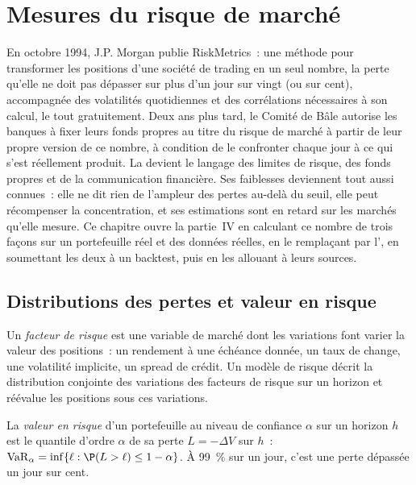 \chapter{Mesures du risque de marché}\label{ch:rc:market-risk-measures}

En octobre 1994, J.P. Morgan publie RiskMetrics~: une méthode pour transformer les positions d'une société de trading
en un seul nombre, la perte qu'elle ne doit pas dépasser sur plus d'un jour sur vingt (ou
sur cent), accompagnée des volatilités quotidiennes et des corrélations nécessaires à son calcul,
le tout gratuitement. Deux ans plus tard, le Comité de Bâle autorise les banques à fixer leurs fonds propres
au titre du risque de marché à partir de leur propre version de ce nombre, à condition
de le confronter chaque jour à ce qui s'est réellement produit. La  devient le langage
des limites de risque, des fonds propres et de la communication financière. Ses faiblesses deviennent tout aussi connues~: elle ne dit rien de l'ampleur des pertes au-delà du seuil,
elle peut récompenser la concentration, et ses estimations sont en retard sur les marchés qu'elle mesure. Ce chapitre
ouvre la partie~IV en calculant ce nombre de trois façons sur un portefeuille réel et des données réelles,
en le remplaçant par l', en soumettant les deux à un backtest, puis en les allouant à leurs sources.

\section{Distributions des pertes et valeur en risque}

\begin{definition}\label{def:rc:market-risk-measures:factor}
Un \emph{facteur de risque} est une variable de marché dont les variations font
varier la valeur des positions~: un rendement à une échéance donnée, un taux de change, une volatilité implicite, un spread de crédit.
Un modèle de risque décrit la distribution conjointe des variations des facteurs de risque sur un horizon
et réévalue les positions sous ces variations.
\end{definition}

\begin{definition}\label{def:rc:market-risk-measures:var}
La \emph{valeur en risque} d'un portefeuille au niveau de confiance $\alpha$ sur
un horizon $h$ est le quantile d'ordre $\alpha$ de sa perte $L = -\Delta V$ sur $h$~:
$\mathrm{VaR}_\alpha = \inf\{\ell:\P(L>\ell)\le1-\alpha\}$. À 99~\% sur un jour, c'est une perte dépassée
un jour sur cent.
\end{definition}

